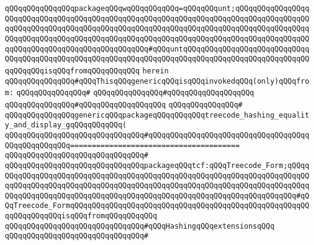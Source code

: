 \verb|qQQqqQQqqQQqqQQqpackageqQQqwqQQqqQQqqQQq=qQQqqQQqunt;qQQqqQQqqQQqqQQqqQQqqQQqqQQqqQQqqQQqqQQqqQQqqQQqqQQqqQQqqQQqqQQqqQQqqQQqqQQqqQQqqQQqqQQqqQQqqQQqqQQqqQQqqQQqqQQqqQQqqQQqqQQqqQQqqQQqqQQqqQQqqQQqqQQqqQQqqQQqqQQqqQQqqQQqqQQqqQQqqQQqqQQqqQQqqQQqqQQqqQQqqQQqqQQqqQQqqQQqqQQqqQQqqQQqqQQqqQQqqQQqqQQqqQQqqQQqqQQqqQQq#qQQquntqQQqqQQqqQQqqQQqqQQqqQQqqQQqqQQqqQQqqQQqqQQqqQQqqQQqqQQqqQQqqQQqqQQqqQQqqQQqqQQqqQQqqQQqqQQqqQQqqQQqqQQqqQQqisqQQqfromqQQqqQQqqQQq|\newline
\verb|herein|\newline
\newline
\verb|qQQqqQQqqQQqqQQq#qQQqThisqQQqgenericqQQqisqQQqinvokedqQQq(only)qQQqfrom:|\newline
\verb|qQQqqQQqqQQqqQQq#|\newline
\verb|qQQqqQQqqQQqqQQq#qQQqqQQqqQQqqQQqqQQq|\newline
\verb|qQQqqQQqqQQqqQQq#qQQqqQQqqQQqqQQqqQQq|\newline
\verb|qQQqqQQqqQQqqQQq#|\newline
\verb|qQQqqQQqqQQqqQQqgenericqQQqpackageqQQqqQQqqQQqtreecode_hashing_equality_and_display_gqQQqqQQqqQQq(|\newline
\verb|qQQqqQQqqQQqqQQqqQQqqQQqqQQqqQQq#qQQqqQQqqQQqqQQqqQQqqQQqqQQqqQQqqQQqqQQqqQQqqQQqqQQq=======================================|\newline
\verb|qQQqqQQqqQQqqQQqqQQqqQQqqQQqqQQq#|\newline
\verb|qQQqqQQqqQQqqQQqqQQqqQQqqQQqqQQqpackageqQQqtcf:qQQqTreecode_Form;qQQqqQQqqQQqqQQqqQQqqQQqqQQqqQQqqQQqqQQqqQQqqQQqqQQqqQQqqQQqqQQqqQQqqQQqqQQqqQQqqQQqqQQqqQQqqQQqqQQqqQQqqQQqqQQqqQQqqQQqqQQqqQQqqQQqqQQqqQQqqQQqqQQqqQQqqQQqqQQqqQQqqQQqqQQqqQQqqQQqqQQqqQQqqQQqqQQqqQQqqQQqqQQqqQQq#qQQqTreecode_FormqQQqqQQqqQQqqQQqqQQqqQQqqQQqqQQqqQQqqQQqqQQqqQQqqQQqqQQqqQQqqQQqqQQqisqQQqfromqQQqqQQqqQQq|\newline
\newline
\verb|qQQqqQQqqQQqqQQqqQQqqQQqqQQqqQQq#qQQqHashingqQQqextensionsqQQq|\newline
\verb|qQQqqQQqqQQqqQQqqQQqqQQqqQQqqQQq#|\newline
